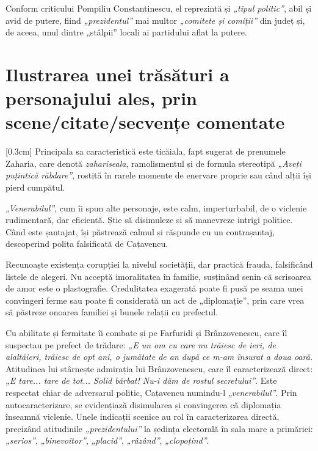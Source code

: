 Conform criticului Pompiliu Constantinescu, el reprezintă și \textit{„tipul politic”}, abil și avid de putere, fiind \textit{„prezidentul”} mai multor \textit{„comitete și comiții”} din județ și, de aceea, unul dintre „stâlpii” locali ai partidului aflat la putere.

\section{Ilustrarea unei trăsături a personajului ales, prin sce\-ne/ci\-ta\-te/sec\-ven\-țe comentate}

[0.3cm]
Principala sa caracteristică este ticăiala, fapt sugerat de prenumele Zaharia, care denotă \textit{zahariseala}, ramolismentul și de formula stereotipă \textit{„Aveți puțintică răbdare”}, rostită în rarele momente de enervare proprie sau când alții își pierd cumpătul.

\textit{„Venerabilul”}, cum îi spun alte personaje, este calm, imperturbabil, de o viclenie rudimentară, dar eficientă. Știe să disimuleze și să manevreze intrigi politice. Când este șantajat, își păstrează calmul și răspunde cu un contrașantaj, descoperind polița falsificată de Cațavencu.

Recunoaște existența corupției la nivelul societății, dar practică frauda, falsificând listele de alegeri. Nu acceptă imoralitatea în familie, susținând senin că scrisoarea de amor este o plastografie. Credulitatea exagerată poate fi pusă pe seama unei convingeri ferme sau poate fi considerată un act de „diplomație”, prin care vrea să păstreze onoarea familiei și bunele relații cu prefectul.

Cu abilitate și fermitate îi combate și pe Farfuridi și Brânzovenescu, care îl suspectau pe prefect de trădare: \textit{„E un om cu care nu trăiesc de ieri, de alaltăieri, trăiesc de opt ani, o jumătate de an după ce m-am însurat a doua oară.} Atitudinea lui stârnește admirația lui Brânzovenescu, care îl caracterizează direct: \textit{„E tare... tare de tot... Solid bărbat! Nu-i dăm de rostul secretului”}. Este respectat chiar de adversarul politic, Cațavencu numindu-l \textit{„venerabilul”}. Prin autocaracterizare, se evidențiază disimularea și convingerea că diplomația înseamnă viclenie. Unele indicații scenice au rol în caracterizarea directă, precizând atitudinile \textit{„prezidentului”} la ședința electorală în sala mare a primăriei: \textit{„serios”}, \textit{„binevoitor”}, \textit{„placid”}, \textit{„râzând”}, \textit{„clopoțind”}.

